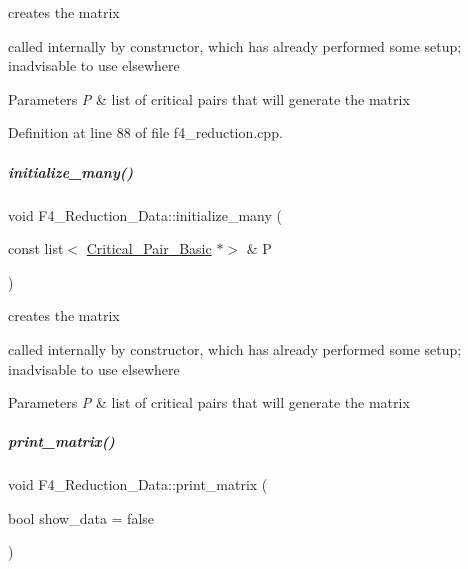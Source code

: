 creates the matrix 

called internally by constructor, which has already performed some setup; inadvisable to use elsewhere 
\begin{DoxyParams}{Parameters}
{\em P} & list of critical pairs that will generate the matrix \\
\hline
\end{DoxyParams}


Definition at line 88 of file f4\+\_\+reduction.\+cpp.

\mbox{\label{group___g_b_computation_a0fd30b42c2dcf0dd07dfa898f71c8751}} 
\subparagraph{\texorpdfstring{initialize\+\_\+many()}{initialize\_many()}\hspace{0.1cm}{\footnotesize\ttfamily [2/2]}}
{\footnotesize\ttfamily void F4\+\_\+\+Reduction\+\_\+\+Data\+::initialize\+\_\+many (\begin{DoxyParamCaption}\item[{const list$<$ \hyperlink{group___g_b_computation_class_critical___pair___basic}{Critical\+\_\+\+Pair\+\_\+\+Basic} $\ast$$>$ \&}]{P }\end{DoxyParamCaption})}



creates the matrix 

called internally by constructor, which has already performed some setup; inadvisable to use elsewhere 
\begin{DoxyParams}{Parameters}
{\em P} & list of critical pairs that will generate the matrix \\
\hline
\end{DoxyParams}
\mbox{\label{group___g_b_computation_a9f3e9b5617084c34f97acd23d6e67a43}} 
\subparagraph{\texorpdfstring{print\+\_\+matrix()}{print\_matrix()}\hspace{0.1cm}{\footnotesize\ttfamily [1/2]}}
{\footnotesize\ttfamily void F4\+\_\+\+Reduction\+\_\+\+Data\+::print\+\_\+matrix (\begin{DoxyParamCaption}\item[{bool}]{show\+\_\+data = {\ttfamily false} }\end{DoxyParamCaption})}



